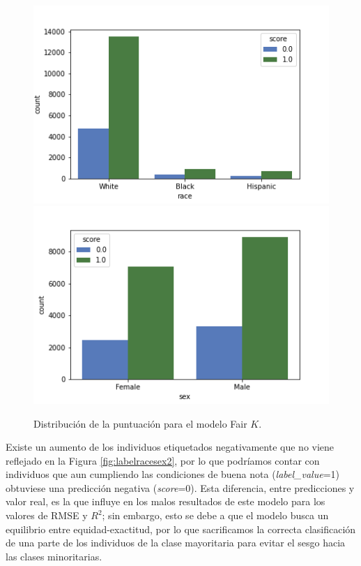 \documentclass[oneside,openright,titlepage,numbers=noenddot,openany,headinclude,footinclude=true,
cleardoublepage=empty,abstractoff,BCOR=5mm,paper=a4,fontsize=12pt,main=spanish]{scrreprt}
\begin{document}
\begin{figure}[H]
      \includegraphics[width=\linewidth]{images/score_fair_k_race_law.png}
    \endminipage\hfill
      \includegraphics[width=\linewidth]{images/score_fair_k_sex_law.png}
    \endminipage
     \caption{Distribución de la puntuación para el modelo Fair $K$.}
     \label{fig:scorefairk}
\end{figure}

Existe un aumento de los individuos etiquetados negativamente que no viene reflejado en la Figura \ref{fig:labelracesex2}, por lo que podríamos contar con individuos que aun cumpliendo las condiciones de buena nota (\textit{label\_value}=1) obtuviese una predicción negativa (\textit{score}=0). Esta diferencia, entre predicciones y valor real, es la que influye en los malos resultados de este modelo para los valores de RMSE y $R^2$; sin embargo, esto se debe a que el modelo busca un equilibrio entre equidad-exactitud, por lo que sacrificamos la correcta clasificación de una parte de los individuos de la clase mayoritaria para evitar el sesgo hacia las clases minoritarias.
\end{document}
